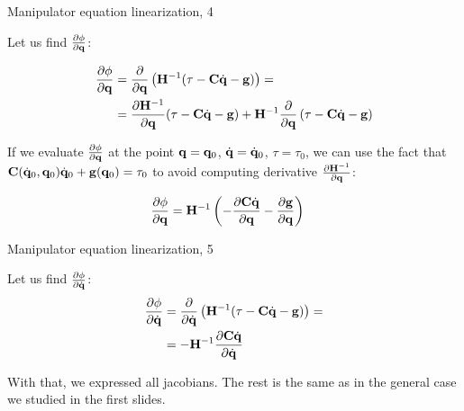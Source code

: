 \documentclass{beamer}
\begin{document}
\begin{frame}{Manipulator equation linearization, 4}
	\begin{flushleft}
		
		Let us find $\frac{\partial \phi}{\partial \mathbf{q}}$:
		
		\begin{align}
			\frac{\partial \phi}{\partial \mathbf{q}}
			&=
			\frac{\partial }{\partial \mathbf{q}} \left(\mathbf{H}^{-1} (\tau - \mathbf{C} \dot{\mathbf{q}} - \mathbf{g} ) \right)
			= \\
			&=
			\frac{\partial \mathbf{H}^{-1}}{\partial \mathbf{q}} (\tau - \mathbf{C} \dot{\mathbf{q}} - \mathbf{g} )
			+
			\mathbf{H}^{-1} \frac{\partial }{\partial \mathbf{q}} \left( \tau - \mathbf{C} \dot{\mathbf{q}} - \mathbf{g} \right)
		\end{align}
		
		If we evaluate $\frac{\partial \phi}{\partial \mathbf{q}}$ at the point $\mathbf{q} = \mathbf{q}_0$, $\dot{\mathbf{q}} = \dot{\mathbf{q}}_0$, $\tau = \tau_0$, we can use the fact that $\mathbf{C}(\dot{\mathbf{q}}_0, \mathbf{q}_0) \dot{\mathbf{q}}_0 + \mathbf{g}(\mathbf{q}_0) = \tau_0$ to avoid computing derivative $\frac{\partial \mathbf{H}^{-1}}{\partial \mathbf{q}}$:
		
		\begin{align}
			\frac{\partial \phi}{\partial \mathbf{q}}
			&=
			\mathbf{H}^{-1} \left( - \frac{\partial \mathbf{C}\dot{\mathbf{q}}}{\partial \mathbf{q}}  - \frac{\partial \mathbf{g}}{\partial \mathbf{q}} \right)
		\end{align}
		
	\end{flushleft}
\end{frame}




\begin{frame}{Manipulator equation linearization, 5}
	\begin{flushleft}
		
		Let us find $\frac{\partial \phi}{\partial \dot{\mathbf{q}}}$:
		\begin{align}
			\frac{\partial \phi}{\partial \dot{\mathbf{q}}}
			&=
			\frac{\partial }{\partial \dot{\mathbf{q}}} \left(\mathbf{H}^{-1} (\tau - \mathbf{C} \dot{\mathbf{q}} - \mathbf{g} ) \right)
			= \\
			&=
			-\mathbf{H}^{-1}\frac{\partial \mathbf{C} \dot{\mathbf{q}}}{\partial \dot{\mathbf{q}}}
		\end{align}
		
	With that, we expressed all jacobians. The rest is the same as in the general case we studied in the first slides.
		
	\end{flushleft}
\end{frame}
\end{document}
